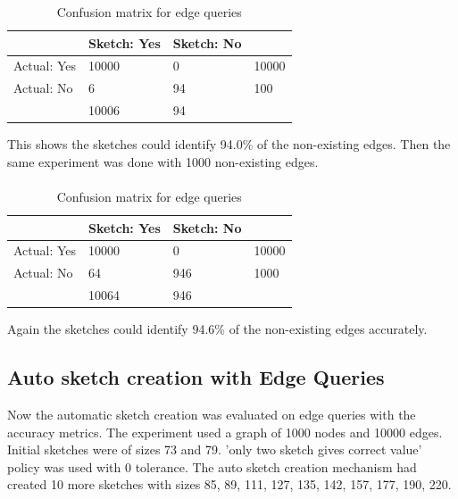 \documentclass[12pt]{report}
\numberwithin{figure}{section}
\numberwithin{table}{section}
\begin{document}
\begin{table}[H]
\centering
\begin{tabular}{l|l|l|l}
\cline{2-3}
                                  & Sketch: Yes & Sketch: No &                            \\ \hline
\multicolumn{1}{|l|}{Actual: Yes} & 10000       & 0          & \multicolumn{1}{l|}{10000} \\ \hline
\multicolumn{1}{|l|}{Actual: No}  & 6          & 94        & \multicolumn{1}{l|}{100}  \\ \hline
                                  & 10006       & 94        &                            \\ \cline{2-3}
\end{tabular}
\caption{Confusion matrix for edge queries}
\end{table}

This shows the sketches could identify 94.0\% of the non-existing edges. Then the same experiment was  done with 1000 non-existing edges.

\paragraph{}

\begin{table}[H]
\centering
\begin{tabular}{l|l|l|l}
\cline{2-3}
                                  & Sketch: Yes & Sketch: No &                            \\ \hline
\multicolumn{1}{|l|}{Actual: Yes} & 10000       & 0          & \multicolumn{1}{l|}{10000} \\ \hline
\multicolumn{1}{|l|}{Actual: No}  & 64          & 946        & \multicolumn{1}{l|}{1000}  \\ \hline
                                  & 10064       & 946        &                            \\ \cline{2-3}
\end{tabular}
\caption{Confusion matrix for edge queries}
\end{table}

Again the sketches could identify 94.6\% of the non-existing edges accurately.


\subsection{Auto sketch creation with Edge Queries}

Now the automatic sketch creation was evaluated on edge queries with the accuracy metrics. The experiment used a graph of 1000 nodes and 10000 edges. Initial sketches were of sizes 73 and 79. 'only two sketch gives correct value' policy was used with 0 tolerance. The auto sketch creation mechanism had created 10 more sketches with sizes 85, 89, 111, 127, 135, 142, 157, 177, 190, 220.
\end{document}

